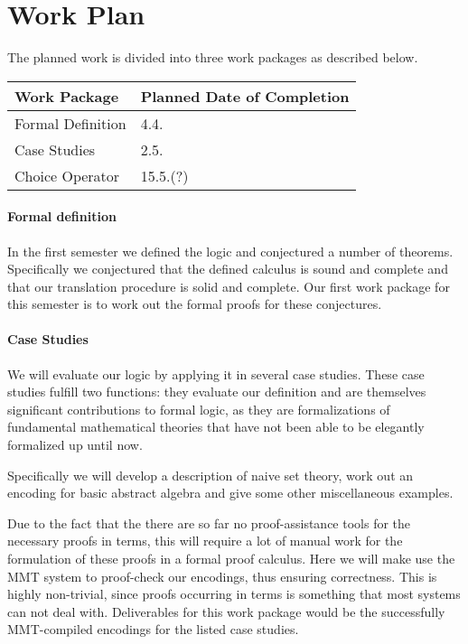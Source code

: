 \documentclass[a4paper,10pt]{article}
\begin{document}
\section{Work Plan}
The planned work is divided into three work packages as described below.\\

\begin{tabular}{|p{3.5cm}|p{5cm}|}
\hline
Work Package & Planned Date of Completion\\
\hline
Formal Definition & 4.4.\\
Case Studies & 2.5.\\
Choice Operator & 15.5.(?)\\
\hline
\end{tabular}

\paragraph{Formal definition}
In the first semester we defined the logic and conjectured a number of theorems. Specifically we conjectured that the defined calculus is sound and complete and that our translation procedure is solid and complete. Our first work package for this semester is to work out the formal proofs for these conjectures. 

\paragraph{Case Studies}
We will evaluate our logic by applying it in several case studies. 
These case studies fulfill two functions: they evaluate our definition and are themselves significant contributions to formal logic, as they are formalizations of fundamental mathematical theories that have not been able to be elegantly formalized up until now. 

Specifically we will develop a description of naive set theory, work out an encoding for basic abstract algebra and give some other miscellaneous examples.

Due to the fact that the there are so far no proof-assistance tools for the necessary proofs in terms, this will require a lot of manual work for the formulation of these proofs in a formal proof calculus. Here we will make use the MMT system to proof-check our encodings, thus ensuring correctness. This is highly non-trivial, since proofs occurring in terms is something that most systems can not deal with. Deliverables for this work package would be the successfully MMT-compiled encodings for the listed case studies.
\end{document}
